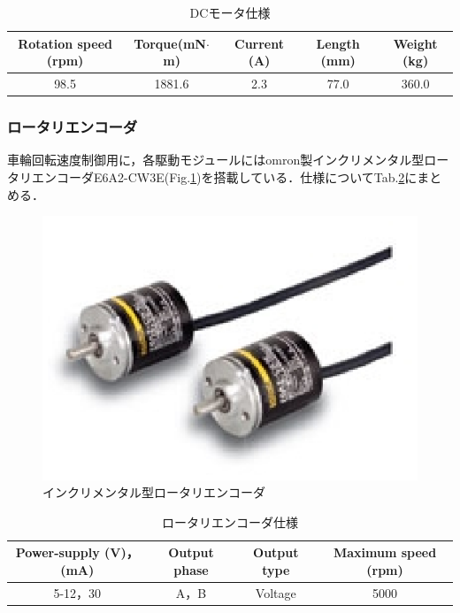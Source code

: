 \begin{table}[hb]
	\centering
	\caption{DCモータ仕様}
	\begin{tabular}{|c|c|c|c|c|} \hline
		Rotation speed (rpm) & Torque(mN$\cdot$m) & Current (A) & Length (mm) & Weight (kg)  \\ \hline \hline
		98.5 & 1881.6 & 2.3 & 77.0 & 360.0 \\ \hline
	\end{tabular}
	\label{motor_spec}

\subsubsection{ロータリエンコーダ}
\par 車輪回転速度制御用に，各駆動モジュールにはomron製インクリメンタル型ロータリエンコーダE6A2-CW3E(Fig.\ref{encoder_fig})を搭載している．仕様についてTab.\ref{encoder_spec}にまとめる．


\end{table}
\begin{figure}[hb]
	\centering
	\includegraphics[clip,scale=0.5]{./figure/e6a2-c.eps}
	\caption{インクリメンタル型ロータリエンコーダ}
	\label{encoder_fig}
\end{figure}

\begin{table}[hb]
	\centering
	\caption{ロータリエンコーダ仕様}
	\begin{tabular}{|c|c|c|c|} \hline
		Power-supply (V)，(mA) & Output phase & Output type & Maximum speed (rpm) \\ \hline \hline
		5-12，30 & A，B & Voltage & 5000 \\ \hline
	\end{tabular}
	\label{encoder_spec}
\end{table}
\newpage

